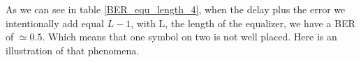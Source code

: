 \documentclass[frenchb, oneside, headings=normal]{scrartcl}
\begin{document}

As we can see in table \ref{BER_equ_length_4}, when the delay plus the error we intentionally add equal $L-1$, with L, the length of the equalizer, we have a BER of $\simeq 0.5$. Which means that one symbol on two is not well placed. Here is an illustration of that phenomena.
\end{document}
